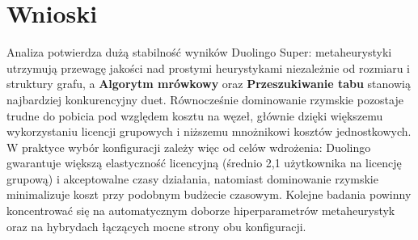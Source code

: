\section{Wnioski}

Analiza potwierdza dużą stabilność wyników Duolingo Super: metaheurystyki utrzymują przewagę jakości nad prostymi heurystykami niezależnie od rozmiaru i struktury grafu, a \textbf{Algorytm mrówkowy} oraz \textbf{Przeszukiwanie tabu} stanowią najbardziej konkurencyjny duet. Równocześnie dominowanie rzymskie pozostaje trudne do pobicia pod względem kosztu na węzeł, głównie dzięki większemu wykorzystaniu licencji grupowych i niższemu mnożnikowi kosztów jednostkowych. W praktyce wybór konfiguracji zależy więc od celów wdrożenia: Duolingo gwarantuje większą elastyczność licencyjną (średnio 2,1 użytkownika na licencję grupową) i akceptowalne czasy działania, natomiast dominowanie rzymskie minimalizuje koszt przy podobnym budżecie czasowym. Kolejne badania powinny koncentrować się na automatycznym doborze hiperparametrów metaheurystyk oraz na hybrydach łączących mocne strony obu konfiguracji.
